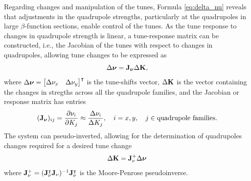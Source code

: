 Regarding changes and manipulation of the tunes, Formula \eqref{eq:delta_nu} reveals that adjustments in the quadrupole strengths, particularly at the quadrupoles in large $\beta$-function sections, enable control of the tunes. As the tune response to changes in quadrupole strength is linear, a tune-response matrix can be constructed, i.e., the Jacobian of the tunes with respect to changes in quadrupoles, allowing tune changes to be expressed as
\begin{equation}
    \Delta\boldsymbol{\nu} = \vb{J}_{\boldsymbol{\nu}}\Delta \vb{K},
\end{equation}
where $\Delta\boldsymbol{\nu} = \mqty*[\Delta \nu_x & \Delta \nu_y]^\intercal$ is the tune-shifts vector, $\Delta \vb{K}$ is the vector containing the changes in stregths across all the quadrupole families, and the Jacobian or response matrix has entries
\begin{equation}
    (\vb{J}_{\boldsymbol{\nu}})_{ij} = \pdv{\nu_{i}}{K_j} \approx \frac{\Delta \nu_{i}}{\Delta K_j}, \quad i=x, y,\quad j\in\text{quadrupole families}.
\end{equation}
The system can pseudo-inverted, allowing for the determination of quadrupoles changes required for a desired tune change
\begin{equation}
    \Delta \vb{K} = \vb{J}_{\nu}^{+}\Delta \boldsymbol{\nu}
\end{equation}
where $\vb{J}_{\nu}^{+} = (\vb{J}_{\nu}^{\intercal}\vb{J}_{\nu})^{-1}\vb{J}_{\nu}^{\intercal}$ is the Moore-Penrose pseudoinverse.

